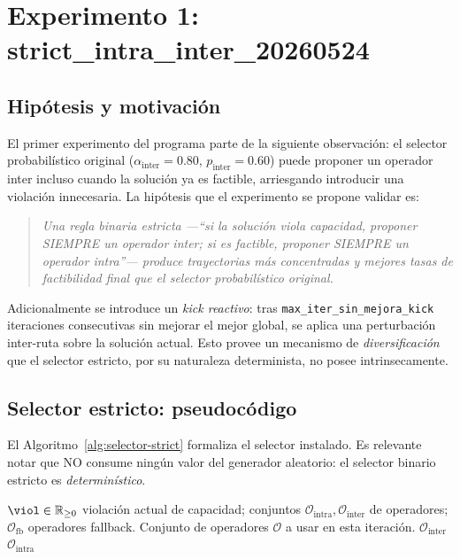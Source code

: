\section{Experimento 1: strict\_intra\_inter\_20260524}
\label{sec:exp-strict}

\subsection{Hipótesis y motivación}

El primer experimento del programa parte de la siguiente observación:
el selector probabilístico original
($\alpha_{\text{inter}} = 0.80$, $p_{\text{inter}} = 0.60$) puede
proponer un operador inter incluso cuando la solución ya es factible,
arriesgando introducir una violación innecesaria. La hipótesis que el
experimento se propone validar es:

\begin{quote}
\textit{Una regla \emph{binaria estricta} ---``si la solución viola
capacidad, proponer SIEMPRE un operador inter; si es factible, proponer
SIEMPRE un operador intra''--- produce trayectorias más concentradas y
mejores tasas de factibilidad final que el selector probabilístico
original.}
\end{quote}

Adicionalmente se introduce un \emph{kick reactivo}: tras
\texttt{max\_iter\_sin\_mejora\_kick} iteraciones consecutivas sin
mejorar el mejor global, se aplica una perturbación inter-ruta sobre
la solución actual. Esto provee un mecanismo de \emph{diversificación}
que el selector estricto, por su naturaleza determinista, no posee
intrinsecamente.

\subsection{Selector estricto: pseudocódigo}

El Algoritmo~\ref{alg:selector-strict} formaliza el selector instalado.
Es relevante notar que NO consume ningún valor del generador
aleatorio: el selector binario estricto es \emph{determinístico}.

\begin{algorithm}[h]
\caption{Selector binario estricto.}
\label{alg:selector-strict}
\begin{algorithmic}[1]
\Require $\viol \in \mathbb{R}_{\ge 0}$ violación actual de capacidad;
  conjuntos $\mathcal{O}_{\text{intra}}, \mathcal{O}_{\text{inter}}$ de operadores;
  $\mathcal{O}_{\text{fb}}$ operadores fallback.
\Ensure Conjunto de operadores $\mathcal{O}$ a usar en esta iteración.
 
  \State \Return $\mathcal{O}_{\text{inter}}$
\Else
  \State \Return $\mathcal{O}_{\text{intra}}$
\EndIf
\end{algorithmic}
\end{algorithm}


